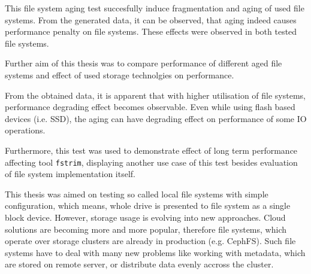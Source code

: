 \documentclass[
  color, %
  table, %
  lof,   %
  lot,   %
]{fithesis3}
\begin{document}
This file system aging test succesfully induce fragmentation and aging of used file systems. From the generated data, it can be observed, that aging indeed causes performance penalty on file systems. These effects were observed in both tested file systems.





Further aim of this thesis was to compare performance of different aged file systems and effect of used storage technolgies on performance.

From the obtained data, it is apparent that with higher utilisation of file systems, performance degrading effect becomes observable. Even while using flash based devices (i.e. SSD), the aging can have degrading effect on performance of some IO operations.


Furthermore, this test was used to demonstrate effect of long term performance affecting tool \texttt{fstrim}, displaying another use case of this test besides evaluation of file system implementation itself.


This thesis was aimed on testing so called local file systems with simple configuration, which means, whole drive is presented to file system as a single block device. However, storage usage is evolving into new approaches. Cloud solutions are becoming more and more popular, therefore file systems, which operate over storage clusters are already in production (e.g. CephFS\footnotemark[1]). Such file systems have to deal with many new problems like working with metadata, which are stored on remote server, or distribute data evenly accross the cluster.
\end{document}
